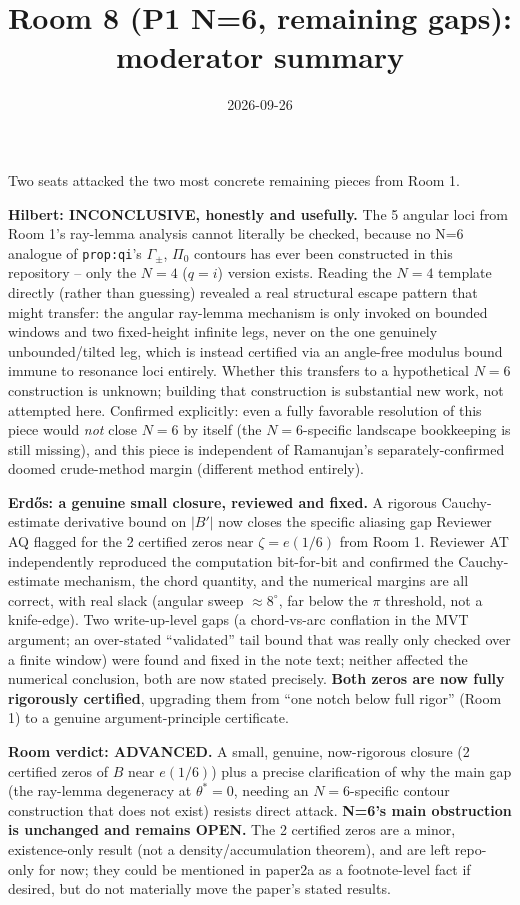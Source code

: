 \documentclass[11pt]{article}
\title{Room 8 (P1 N=6, remaining gaps): moderator summary}
\date{2026-09-26}
\begin{document}
\maketitle

Two seats attacked the two most concrete remaining pieces from Room 1.

\textbf{Hilbert: INCONCLUSIVE, honestly and usefully.} The 5 angular loci from Room 1's ray-lemma
analysis cannot literally be checked, because no N=6 analogue of \texttt{prop:qi}'s $\Gamma_\pm$,
$\Pi_0$ contours has ever been constructed in this repository -- only the $N=4$ ($q=i$) version
exists. Reading the $N=4$ template directly (rather than guessing) revealed a real structural
escape pattern that might transfer: the angular ray-lemma mechanism is only invoked on bounded
windows and two fixed-height infinite legs, never on the one genuinely unbounded/tilted leg, which
is instead certified via an angle-free modulus bound immune to resonance loci entirely. Whether
this transfers to a hypothetical $N=6$ construction is unknown; building that construction is
substantial new work, not attempted here. Confirmed explicitly: even a fully favorable resolution
of this piece would \emph{not} close $N=6$ by itself (the $N=6$-specific landscape bookkeeping is
still missing), and this piece is independent of Ramanujan's separately-confirmed doomed
crude-method margin (different method entirely).

\textbf{Erd\H os: a genuine small closure, reviewed and fixed.} A rigorous Cauchy-estimate
derivative bound on $|B'|$ now closes the specific aliasing gap Reviewer AQ flagged for the 2
certified zeros near $\zeta=e(1/6)$ from Room 1. Reviewer AT independently reproduced the
computation bit-for-bit and confirmed the Cauchy-estimate mechanism, the chord quantity, and the
numerical margins are all correct, with real slack (angular sweep $\approx8^\circ$, far below the
$\pi$ threshold, not a knife-edge). Two write-up-level gaps (a chord-vs-arc conflation in the MVT
argument; an over-stated ``validated'' tail bound that was really only checked over a finite window)
were found and fixed in the note text; neither affected the numerical conclusion, both are now
stated precisely. \textbf{Both zeros are now fully rigorously certified}, upgrading them from ``one
notch below full rigor'' (Room 1) to a genuine argument-principle certificate.

\textbf{Room verdict: ADVANCED.} A small, genuine, now-rigorous closure (2 certified zeros of $B$
near $e(1/6)$) plus a precise clarification of why the main gap (the ray-lemma degeneracy at
$\theta^\ast=0$, needing an $N=6$-specific contour construction that does not exist) resists direct
attack. \textbf{N=6's main obstruction is unchanged and remains OPEN.} The 2 certified zeros are a
minor, existence-only result (not a density/accumulation theorem), and are left repo-only for now;
they could be mentioned in paper2a as a footnote-level fact if desired, but do not materially move
the paper's stated results.
\end{document}

